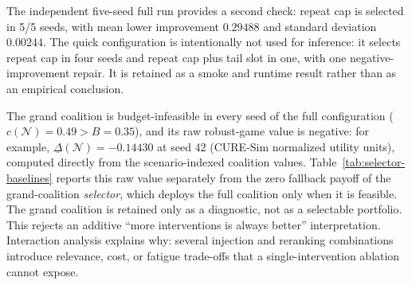 \documentclass[pdflatex,sn-mathphys-num]{sn-jnl}
\theoremstyle{thmstyleone}
\theoremstyle{thmstyletwo}
\theoremstyle{thmstylethree}
\newcommand{\Players}{\mathcal{N}}
\begin{document}
The independent five-seed full run provides a second check: repeat cap is selected in 5/5 seeds, with mean lower improvement $0.29488$ and standard deviation $0.00244$. The quick configuration is intentionally not used for inference: it selects repeat cap in four seeds and repeat cap plus tail slot in one, with one negative-improvement repair. It is retained as a smoke and runtime result rather than as an empirical conclusion.

\begin{table}[t]
\caption{Behavioural exact-game seed studies. Lower improvement is the worst-scenario utility change relative to the base policy.}\label{tab:behavioural}
\centering
\scriptsize
\setlength{\tabcolsep}{3pt}
\end{table}

The grand coalition is budget-infeasible in every seed of the full configuration ($c(\Players)=0.49>B=0.35$), and its raw robust-game value is negative: for example, $\underline{\Delta}(\Players)=-0.14430$ at seed 42 (CURE-Sim normalized utility units), computed directly from the scenario-indexed coalition values. Table~\ref{tab:selector-baselines} reports this raw value separately from the zero fallback payoff of the grand-coalition \emph{selector}, which deploys the full coalition only when it is feasible. The grand coalition is retained only as a diagnostic, not as a selectable portfolio. This rejects an additive ``more interventions is always better'' interpretation. Interaction analysis explains why: several injection and reranking combinations introduce relevance, cost, or fatigue trade-offs that a single-intervention ablation cannot expose.
\end{document}
